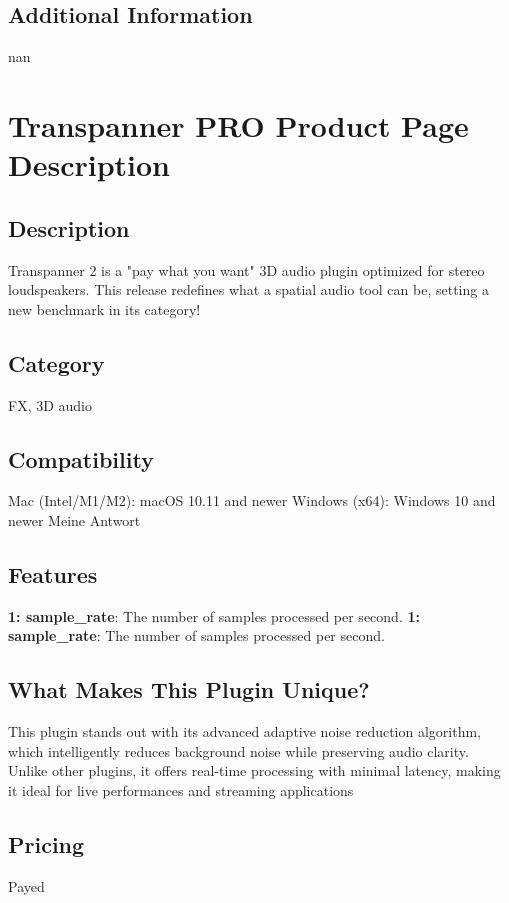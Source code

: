 \documentclass[8pt]{article}
\begin{document}
    \subsection*{Additional Information}
    nan
    

    \section*{Transpanner PRO  Product Page Description}

    \subsection*{Description}
    Transpanner 2 is a "pay what you want" 3D audio plugin optimized for stereo loudspeakers. This release redefines what a spatial audio tool can be, setting a new benchmark in its category!

    \subsection*{Category}
    FX, 3D audio

    \subsection*{Compatibility}
    Mac (Intel/M1/M2): macOS 10.11 and newer
Windows (x64): Windows 10 and newer
Meine Antwort


    \subsection*{Features}
    \textbf{1: sample\_rate}: The number of samples processed per second.
\textbf{1: sample\_rate}: The number of samples processed per second.

    \subsection*{What Makes This Plugin Unique?}
    This plugin stands out with its advanced adaptive noise reduction algorithm, which intelligently reduces background noise while preserving audio clarity. Unlike other plugins, it offers real-time processing with minimal latency, making it ideal for live performances and streaming applications

    \subsection*{Pricing}
    Payed
\end{document}
